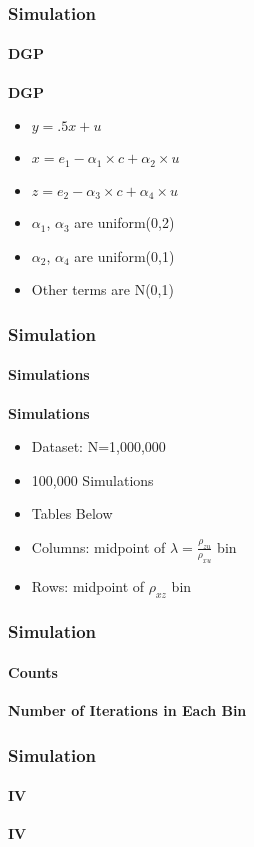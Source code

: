 \documentclass{beamer}
\begin{document}
\begin{frame}
\frametitle{Simulation}
\framesubtitle{DGP}
\textbf{DGP} \\ \bigskip \pause

\begin{itemize}
     \item $y=.5x+u$ \pause
     \item $x=e_1-\alpha_1\times c+\alpha_2 \times u$ \pause
     \item $z=e_2-\alpha_3\times c+\alpha_4 \times u$ \pause
     \item $\alpha_1$, $\alpha_3$ are uniform(0,2) \pause
     \item $\alpha_2$, $\alpha_4$ are uniform(0,1) \pause
     \item Other terms are N(0,1)
\end{itemize}

\end{frame}

\begin{frame}
\frametitle{Simulation}
\framesubtitle{Simulations}
\textbf{Simulations} \\ \bigskip \pause

\begin{itemize}
     \item Dataset: N=1,000,000 \pause
     \item 100,000 Simulations \pause
     \item Tables Below \pause
     \item Columns: midpoint of $\lambda=\frac{\rho_{zu}}{\rho_{xu}}$ bin \pause
     \item Rows: midpoint of $\rho_{xz}$ bin
\end{itemize}

\end{frame}

\begin{frame}
\frametitle{Simulation}
\framesubtitle{Counts}
\textbf{Number of Iterations in Each Bin} \\ \pause
\footnotesize{

}
\end{frame}

\begin{frame}
\frametitle{Simulation}
\framesubtitle{IV}
\textbf{IV} \\ \pause
\footnotesize{

}
\end{frame}
\end{document}
